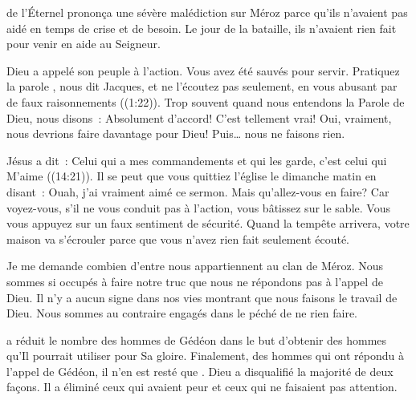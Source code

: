  de l'Éternel prononça une sévère malédiction sur Méroz
 parce qu'ils n'avaient pas aidé en temps de crise et de besoin.
 Le jour de la bataille, ils n'avaient rien fait pour venir en aide au Seigneur.

Dieu a appelé son peuple à l'action. Vous avez été sauvés pour servir.
 \og Pratiquez la parole \fg{},  nous dit Jacques,
 \og et ne l'écoutez pas seulement,
 en vous abusant par de faux raisonnements \fg{} ((1:22)).
 Trop souvent quand nous entendons la Parole de Dieu, nous disons~:
 \og Absolument d'accord! C'est tellement vrai!
 Oui, vraiment, nous devrions faire davantage pour Dieu! \fg{}
 Puis\dots{} nous ne faisons rien.


Jésus a dit~:
 \og Celui qui a mes commandements et qui les garde,
 c'est celui qui M'aime \fg{} ((14:21)).
 Il se peut que vous quittiez l'église le dimanche matin en disant~:
 \og Ouah, j'ai vraiment aimé ce sermon. \fg{}
 Mais qu'allez-vous en faire? Car voyez-vous, s'il ne vous conduit pas
 à l'action, vous bâtissez sur le sable.
 Vous vous appuyez sur un faux sentiment de sécurité.
 Quand la tempête arrivera, votre maison va s'écrouler
 parce que vous n'avez rien fait \ocadr seulement écouté.

Je me demande combien d'entre nous appartiennent au clan de Méroz.
 Nous sommes si occupés à faire \og notre truc \fg{} que nous ne répondons pas
 à l'appel de Dieu. Il n'y a aucun signe dans nos vies montrant
 que nous faisons le travail de Dieu.
 Nous sommes au contraire engagés dans le péché de ne rien faire. 

\dvrule






 a réduit le nombre des hommes de Gédéon
 dans le but d'obtenir des hommes qu'Il pourrait utiliser pour Sa gloire.
 Finalement, des  hommes qui ont répondu à l'appel de Gédéon,
 il n'en est resté que .
 Dieu a disqualifié la majorité de deux façons.
 Il a éliminé ceux qui avaient peur et ceux qui ne faisaient pas attention.


